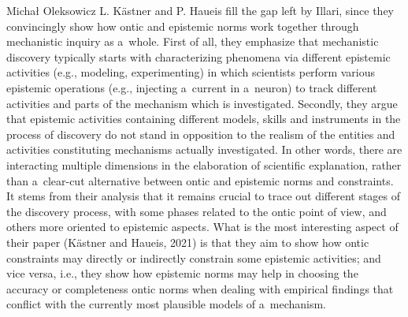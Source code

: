 \begin{artengenv}{Michał Oleksowicz}
L. Kästner and P. Haueis
\parencite*[][]{kastner_discovering_2021} %
fill the gap left by Illari, since they convincingly show how ontic and epistemic norms work together through mechanistic inquiry as a~whole. First of all, they emphasize that mechanistic discovery typically starts with characterizing phenomena via different epistemic activities (e.g., modeling, experimenting) in which scientists perform various epistemic operations (e.g., injecting a~current in a~neuron) to track different activities and parts of the mechanism which is investigated. Secondly, they argue that epistemic activities containing different models, skills and instruments in the process of discovery do not stand in opposition to the realism of the entities and activities constituting mechanisms actually investigated. In other words, there are interacting multiple dimensions in the elaboration of scientific explanation, rather than a~clear-cut alternative between ontic and epistemic norms and constraints. It stems from their analysis that it remains crucial to trace out different stages of the discovery process, with some phases related to the ontic point of view, and others more oriented to epistemic aspects. What is the most interesting aspect of their paper 
\parencite[][]{kastner_discovering_2021}%
(Kästner and Haueis, 2021) is that they aim to show how ontic constraints may directly or indirectly constrain some epistemic activities; and vice versa, i.e., they show how epistemic norms may help in choosing the accuracy or completeness ontic norms when dealing with empirical findings that conflict with the currently most plausible models of a~mechanism.


\end{artengenv}
